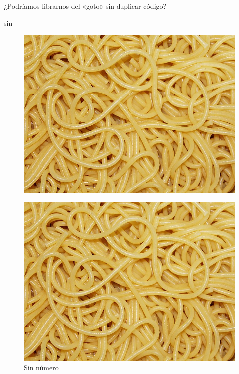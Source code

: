 ¿Podríamos librarnos del «goto» sin duplicar código?

\NoCaptionOfAlgo
\begin{algorithm}[H]
\caption{sin}
\DontPrintSemicolon
{}
\end{algorithm}
\vspace{5mm}

\lipsum[39-41]

\begin{figure}[ht!]
\begin{center}
\includegraphics[width=\linewidth]{espaguetis}
\caption{}
\end{center}
\end{figure}

\lipsum[42-43]

\begin{figure}[ht!]
\begin{center}
\includegraphics[width=\linewidth]{espaguetis}
\caption*{Sin número}
\end{center}
\end{figure}

\lipsum[45]
